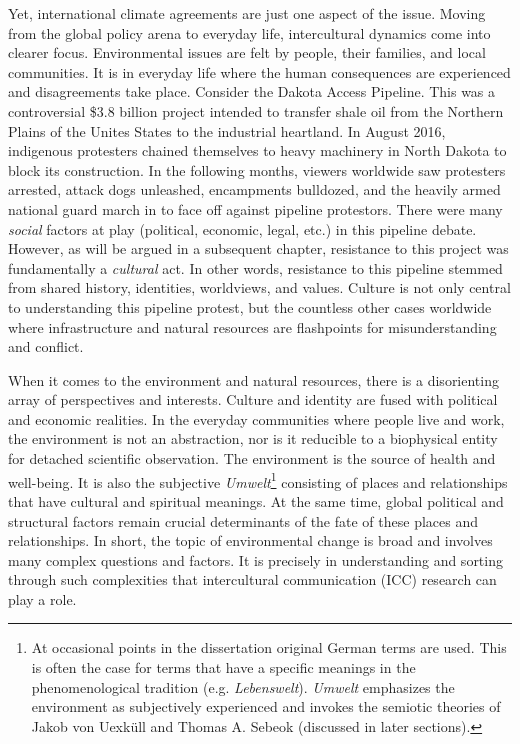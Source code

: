 Yet, international climate agreements are just one aspect of the issue. Moving from the global policy arena to everyday life, intercultural dynamics come into clearer focus. Environmental issues are felt by people, their families, and local communities. It is in everyday life where the human consequences are experienced and disagreements take place. Consider the Dakota Access Pipeline. This was a controversial \$3.8 billion project intended to transfer shale oil from the Northern Plains of the Unites States to the industrial heartland. In August 2016, indigenous protesters chained themselves to heavy machinery in North Dakota to block its construction. In the following months, viewers worldwide saw protesters arrested, attack dogs unleashed, encampments bulldozed, and the heavily armed national guard march in to face off against pipeline protestors. There were many \textit{social} factors at play (political, economic, legal, etc.) in this pipeline debate. However, as will be argued in a subsequent chapter, resistance to this project was fundamentally a \textit{cultural} act. In other words, resistance to this pipeline stemmed from shared history, identities, worldviews, and values. Culture is not only central to understanding this pipeline protest, but the countless other cases worldwide where infrastructure and natural resources are flashpoints for misunderstanding and conflict.	

When it comes to the environment and natural resources, there is a disorienting array of perspectives and interests. Culture and identity are fused with political and economic realities. In the everyday communities where people live and work, the environment is not an abstraction, nor is it reducible to a biophysical entity for detached scientific observation. The environment is the source of health and well-being. It is also the subjective \textit{Umwelt}\footnote{At occasional points in the dissertation original German terms are used. This is often the case for terms that have a specific meanings in the phenomenological tradition (e.g. \textit{Lebenswelt}). \textit{Umwelt} emphasizes the environment as subjectively experienced and invokes the semiotic theories of Jakob von Uexk\"ull and Thomas A. Sebeok (discussed in later sections).} consisting of places and relationships that have cultural and spiritual meanings. At the same time, global political and structural factors remain crucial determinants of the fate of these places and relationships. In short, the topic of environmental change is broad and involves many complex questions and factors. It is precisely in understanding and sorting through such complexities that intercultural communication (ICC) research can play a role. 

